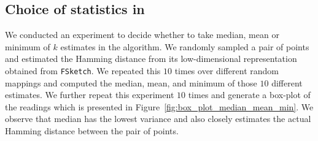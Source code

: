 \subsection{Choice of statistics in \minfsketch}\label{subsec:box_plot_median}
We conducted an experiment to decide whether to take median, mean or minimum of $k$ \fsketch estimates in the \minfsketch algorithm. We randomly sampled a pair of points and estimated the Hamming distance from its low-dimensional representation obtained from  \texttt{FSketch}. We repeated this $10$ times over different random mappings and computed the median, mean, and minimum of those $10$ different estimates. We further repeat this experiment $10$ times and generate a box-plot of the readings which is presented in Figure~\ref{fig:box_plot_median_mean_min}. We observe that median has the lowest variance and also closely estimates the actual Hamming distance between the pair of points. 




